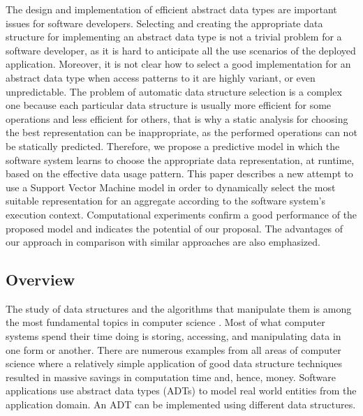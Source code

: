 The design and implementation of efficient abstract data types are important issues for software developers. Selecting and creating the appropriate data structure for implementing an abstract data type is not a trivial problem for a software developer, as it is hard to anticipate all the use scenarios of the deployed application. Moreover, it is not clear how to select a good implementation
for an abstract data type when access patterns to it are
highly variant, or even unpredictable. The problem of automatic data structure selection is a complex one because each particular data structure is usually more efficient for some operations and less efficient for others, that is why a static analysis for choosing the best representation can be inappropriate, as the performed operations can not be statically predicted. Therefore, we propose a predictive model in which the software system learns to choose the appropriate data representation, at runtime, based on the effective data usage pattern. This paper describes a new attempt to use a Support Vector Machine model in order to dynamically select the most suitable representation for an aggregate according to the software system's execution context. Computational
experiments confirm a good performance of the proposed model and indicates the potential of our proposal. The advantages of our approach in comparison with similar approaches are also emphasized.  



\subsection{Overview}

The study of data structures and the algorithms that manipulate them is among the most fundamental topics in computer science \cite{mount}. Most of what
computer systems spend their time doing is storing, accessing, and manipulating data in one form or another. There are numerous examples from all areas
of computer science where a relatively simple application of good data structure techniques resulted in massive savings in computation time and, hence, money. Software applications use abstract data types (ADTs) \cite{adt} to model real world entities from the application domain. An ADT can be implemented using different data structures. 

